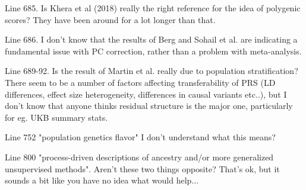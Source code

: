 
\begin{point}{Line 685.}
 Is Khera et al (2018) really the right reference for the idea of polygenic scores? They have been around for a lot longer than that.
\end{point}

\reply{
}

\begin{point}{Line 686. }
 I don't know that the results of Berg and Sohail et al. are indicating a fundamental issue with PC correction, rather than a problem with meta-analysis.
\end{point}


\begin{point}{Line 689-92. }
 Is the result of Martin et al. really due to population stratification? There seem to be a number of factors affecting transferability of PRS (LD differences, effect size heterogeneity, differences in causal variants etc..), but I don't know that anyone thinks residual structure is the major one, particularly for eg. UKB summary stats.
\end{point}


\begin{point}{Line 752 "population genetics flavor"}
I don't understand what this means?
\end{point}


\begin{point}{Line 800}
"process-driven descriptions of ancestry and/or more generalized unsupervised methods". Aren't these two things opposite? That's ok, but it sounds a bit like you have no idea what would help...
\end{point}

